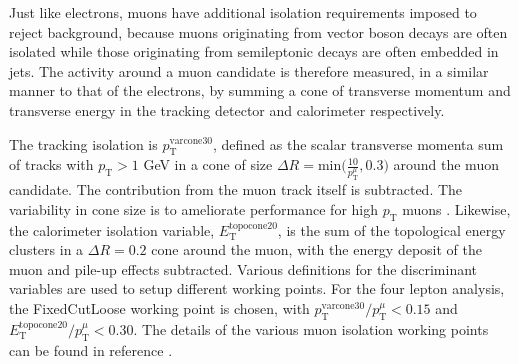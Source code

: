 Just like electrons, muons have additional isolation requirements imposed to reject background, because muons originating from vector boson decays are often isolated while those originating from semileptonic decays are often embedded in jets. The activity around a muon candidate is therefore measured, in a similar manner  to that of the electrons, by summing a cone of transverse momentum and transverse energy in the tracking detector and calorimeter respectively. 

The tracking isolation is $p_{\text{T}}^{\text{varcone30}}$, defined as the scalar transverse momenta sum of tracks with $p_{\text{T}}>1$ GeV in a cone of size $\Delta R=\text{min}\Big(\frac{10}{p_{\text{T}}^{\mu}},0.3\Big)$ around the muon candidate. The contribution from the muon track itself is subtracted. The variability in cone size is to ameliorate performance for high $p_{\text{T}}$ muons \cite{ATLAS_muon_reco_2016}. Likewise, the calorimeter isolation variable, $E_{\text{T}}^{\text{topocone20}}$, is the sum of the topological energy clusters in a $\Delta R=0.2$ cone around the muon, with the energy deposit of the muon and pile-up effects subtracted. Various definitions for the discriminant variables are used to setup different working points. For the four lepton analysis, the FixedCutLoose working point is chosen, with $p_{\text{T}}^{\text{varcone30}}/p_{\text{T}}^{\mu}<0.15$ and $E_{\text{T}}^{\text{topocone20}}/p_{\text{T}}^{\mu}<0.30$. The details of the various muon isolation working points can be found in reference \cite{ATLAS_muon_reco_2016}.


